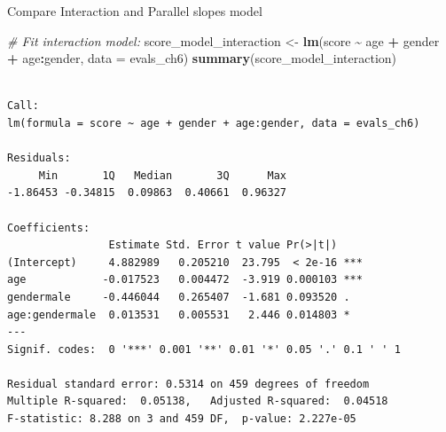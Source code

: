 \documentclass[
  ignorenonframetext,
]{beamer}
\newenvironment{Shaded}{\begin{snugshade}}{\end{snugshade}}
\newcommand{\AttributeTok}[1]{\textcolor[rgb]{0.13,0.29,0.53}{#1}}
\newcommand{\CommentTok}[1]{\textcolor[rgb]{0.56,0.35,0.01}{\textit{#1}}}
\newcommand{\FunctionTok}[1]{\textcolor[rgb]{0.13,0.29,0.53}{\textbf{#1}}}
\newcommand{\NormalTok}[1]{#1}
\newcommand{\OtherTok}[1]{\textcolor[rgb]{0.56,0.35,0.01}{#1}}
\newcommand{\SpecialCharTok}[1]{\textcolor[rgb]{0.81,0.36,0.00}{\textbf{#1}}}
\begin{document}
\begin{frame}[fragile]{Compare Interaction and Parallel slopes model}
\label{compare-interaction-and-parallel-slopes-model}
\scriptsize

\begin{Shaded}
\begin{Highlighting}[]
\CommentTok{\# Fit interaction model:}
\NormalTok{score\_model\_interaction }\OtherTok{\textless{}{-}} \FunctionTok{lm}\NormalTok{(score }\SpecialCharTok{\textasciitilde{}}\NormalTok{ age }\SpecialCharTok{+}\NormalTok{ gender }\SpecialCharTok{+}\NormalTok{ age}\SpecialCharTok{:}\NormalTok{gender, }\AttributeTok{data =}\NormalTok{ evals\_ch6)}
\FunctionTok{summary}\NormalTok{(score\_model\_interaction)}
\end{Highlighting}
\end{Shaded}

\begin{verbatim}

Call:
lm(formula = score ~ age + gender + age:gender, data = evals_ch6)

Residuals:
     Min       1Q   Median       3Q      Max 
-1.86453 -0.34815  0.09863  0.40661  0.96327 

Coefficients:
                Estimate Std. Error t value Pr(>|t|)    
(Intercept)     4.882989   0.205210  23.795  < 2e-16 ***
age            -0.017523   0.004472  -3.919 0.000103 ***
gendermale     -0.446044   0.265407  -1.681 0.093520 .  
age:gendermale  0.013531   0.005531   2.446 0.014803 *  
---
Signif. codes:  0 '***' 0.001 '**' 0.01 '*' 0.05 '.' 0.1 ' ' 1

Residual standard error: 0.5314 on 459 degrees of freedom
Multiple R-squared:  0.05138,   Adjusted R-squared:  0.04518 
F-statistic: 8.288 on 3 and 459 DF,  p-value: 2.227e-05
\end{verbatim}

\normalsize
\end{frame}
\end{document}
